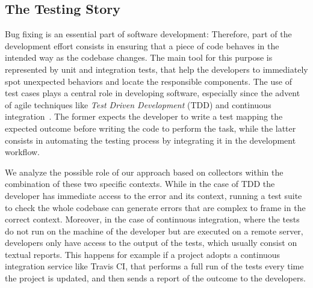 \subsection{The Testing Story}\label{sec:reified-story-testing}

Bug fixing is an essential part of software development: Therefore, part of the development effort consists in ensuring that a piece of code behaves in the intended way as the codebase changes.
The main tool for this purpose is represented by unit and integration tests, that help the developers to immediately spot unexpected behaviors and locate the responsible components.
The use of test cases plays a central role in developing software, especially since the advent of agile techniques like \emph{Test Driven Development} (TDD) and continuous integration~\cite{Beck2001manifesto}.
The former expects the developer to write a test mapping the expected outcome before writing the code to perform the task, while the latter consists in automating the testing process by integrating it in the development workflow.

We analyze the possible role of our approach based on collectors within the combination of these two specific contexts.
While in the case of TDD the developer has immediate access to the error and its context, running a test suite to check the whole codebase can generate errors that are complex to frame in the correct context.
Moreover, in the case of continuous integration, where the tests do not run on the machine of the developer but are executed on a remote server, developers only have access to the output of the tests, which usually consist on textual reports.
This happens for example if a project adopts a continuous integration service like Travis CI, that performs a full run of the tests every time the project is updated, and then sends a report of the outcome to the developers.

